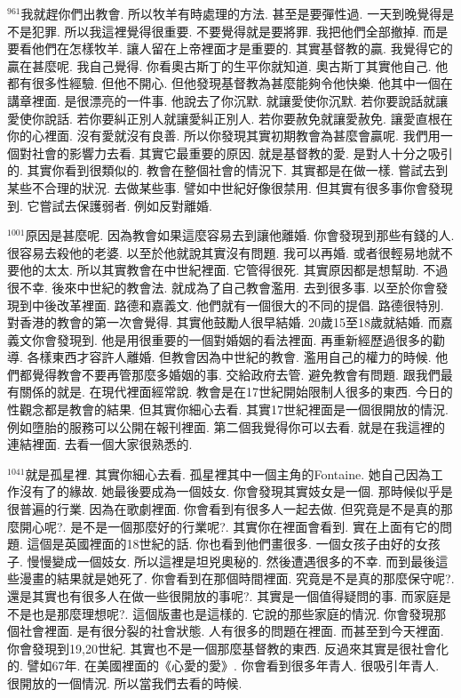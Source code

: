 \documentclass{book}
\begin{document}
$^{961}$我就趕你們出教會.
所以牧羊有時處理的方法.
甚至是要彈性過.
一天到晚覺得是不是犯罪.
所以我這裡覺得很重要.
不要覺得就是要將罪.
我把他們全部撤掉.
而是要看他們在怎樣牧羊.
讓人留在上帝裡面才是重要的.
其實基督教的贏.
我覺得它的贏在甚麼呢.
我自己覺得.
你看奧古斯丁的生平你就知道.
奧古斯丁其實他自己.
他都有很多性經驗.
但他不開心.
但他發現基督教為甚麼能夠令他快樂.
他其中一個在講章裡面.
是很漂亮的一件事.
他說去了你沉默.
就讓愛使你沉默.
若你要說話就讓愛使你說話.
若你要糾正別人就讓愛糾正別人.
若你要赦免就讓愛赦免.
讓愛直根在你的心裡面.
沒有愛就沒有良善.
所以你發現其實初期教會為甚麼會贏呢.
我們用一個對社會的影響力去看.
其實它最重要的原因.
就是基督教的愛.
是對人十分之吸引的.
其實你看到很類似的.
教會在整個社會的情況下.
其實都是在做一樣.
嘗試去到某些不合理的狀況.
去做某些事.
譬如中世紀好像很禁用.
但其實有很多事你會發現到.
它嘗試去保護弱者.
例如反對離婚.

$^{1001}$原因是甚麼呢.
因為教會如果這麼容易去到讓他離婚.
你會發現到那些有錢的人.
很容易去殺他的老婆.
以至於他就說其實沒有問題.
我可以再婚.
或者很輕易地就不要他的太太.
所以其實教會在中世紀裡面.
它管得很死.
其實原因都是想幫助.
不過很不幸.
後來中世紀的教會法.
就成為了自己教會濫用.
去到很多事.
以至於你會發現到中後改革裡面.
路德和嘉義文.
他們就有一個很大的不同的提倡.
路德很特別.
對香港的教會的第一次會覺得.
其實他鼓勵人很早結婚.
20歲15至18歲就結婚.
而嘉義文你會發現到.
他是用很重要的一個對婚姻的看法裡面.
再重新經歷過很多的勸導.
各樣東西才容許人離婚.
但教會因為中世紀的教會.
濫用自己的權力的時候.
他們都覺得教會不要再管那麼多婚姻的事.
交給政府去管.
避免教會有問題.
跟我們最有關係的就是.
在現代裡面經常說.
教會是在17世紀開始限制人很多的東西.
今日的性觀念都是教會的結果.
但其實你細心去看.
其實17世紀裡面是一個很開放的情況.
例如墮胎的服務可以公開在報刊裡面.
第二個我覺得你可以去看.
就是在我這裡的連結裡面.
去看一個大家很熟悉的.

$^{1041}$就是孤星裡.
其實你細心去看.
孤星裡其中一個主角的Fontaine.
她自己因為工作沒有了的緣故.
她最後要成為一個妓女.
你會發現其實妓女是一個.
那時候似乎是很普遍的行業.
因為在歌劇裡面.
你會看到有很多人一起去做.
但究竟是不是真的那麼開心呢?.
是不是一個那麼好的行業呢?.
其實你在裡面會看到.
實在上面有它的問題.
這個是英國裡面的18世紀的話.
你也看到他們畫很多.
一個女孩子由好的女孩子.
慢慢變成一個妓女.
所以這裡是坦兇奧秘的.
然後遭遇很多的不幸.
而到最後這些漫畫的結果就是她死了.
你會看到在那個時間裡面.
究竟是不是真的那麼保守呢?.
還是其實也有很多人在做一些很開放的事呢?.
其實是一個值得疑問的事.
而家庭是不是也是那麼理想呢?.
這個版畫也是這樣的.
它說的那些家庭的情況.
你會發現那個社會裡面.
是有很分裂的社會狀態.
人有很多的問題在裡面.
而甚至到今天裡面.
你會發現到19,20世紀.
其實也不是一個那麼基督教的東西.
反過來其實是很社會化的.
譬如67年.
在美國裡面的《心愛的愛》.
你會看到很多年青人.
很吸引年青人.
很開放的一個情況.
所以當我們去看的時候.
\end{document}
